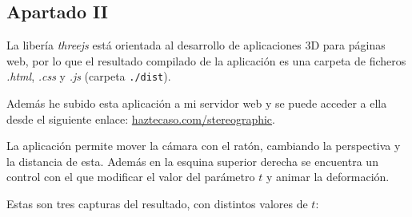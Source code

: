 \documentclass[10pt, spanish]{article}
\theoremstyle{definition}
\theoremstyle{break}
\begin{document}
\subsection{Apartado II}

La libería \textit{threejs} está orientada al desarrollo de aplicaciones 3D para
páginas web, por lo que el resultado compilado de la aplicación es una carpeta
de ficheros \textit{.html}, \textit{.css} y \textit{.js} (carpeta \texttt{./dist}).

Además he subido esta aplicación a mi servidor web y se puede acceder a ella
desde el siguiente enlace:
\href{https://haztecaso.com/stereographic}{haztecaso.com/stereographic}.

La aplicación permite mover la cámara con el ratón, cambiando la perspectiva y
la distancia de esta. Además en la esquina superior derecha se encuentra un
control con el que modificar el valor del parámetro $t$ y animar la deformación.

Estas son tres capturas del resultado, con distintos valores de $t$:
\end{document}

